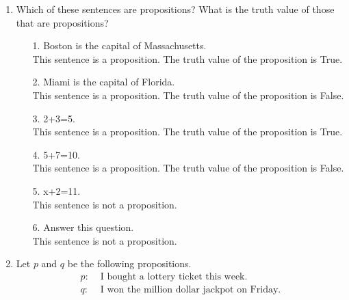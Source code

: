 \documentclass[11pt]{article}
\begin{document}
\vspace{.5cm}

\begin{enumerate}
\item Which of these sentences are propositions? What is the truth
  value of those that are propositions?

  \begin{enumerate}
  \item[1.] Boston is the capital of Massachusetts.\\
  This sentence is a proposition. The truth value of the proposition is True.\\
  
  \item[2.] Miami is the capital of Florida.\\
  This sentence is a proposition. The truth value of the proposition is False.\\
  
  \item[3.] 2+3=5.\\
    This sentence is a proposition. The truth value of the proposition is True.\\
    
  \item[4.] 5+7=10. \\
  This sentence is a proposition. The truth value of the proposition is False.\\
  
  \item[5.] x+2=11.\\
  This sentence is not a proposition.\\
  
  \item[6.] Answer this question.\\
  This sentence is not a proposition.\\
  
  \end{enumerate}

\newpage
\item Let $p$ and $q$ be the following propositions.
  \[\boxed{\begin{array}{rl}
      p: &\text{ I bought a lottery ticket this week.} \\
      q: &\text{ I won the million dollar jackpot on Friday.}
    \end{array}}\]


\end{enumerate}
\end{document}
